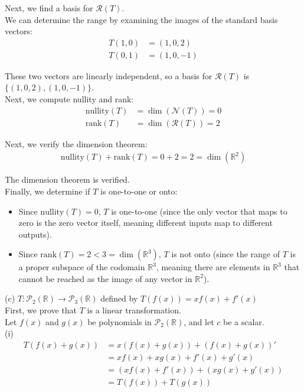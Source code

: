 \documentclass{article}
\begin{document}
Next, we find a basis for $\mathcal{R}(T)$. \\

We can determine the range by examining the images of the standard basis vectors:
\begin{align*}
T(1,0) &= (1,0,2)\\
T(0,1) &= (1,0,-1)
\end{align*}

These two vectors are linearly independent, so a basis for $\mathcal{R}(T)$ is $\{(1,0,2), (1,0,-1)\}$. \\

Next, we compute nullity and rank:
\begin{align*}
    \text{nullity}(T) &= \dim(\mathcal{N}(T)) = 0\\
    \text{rank}(T) &= \dim(\mathcal{R}(T)) = 2
\end{align*}

Next, we verify the dimension theorem:
\begin{align*}
    \text{nullity}(T) + \text{rank}(T) = 0 + 2 = 2 = \dim(\mathbb{R}^2)
\end{align*}

The dimension theorem is verified. \\

Finally, we determine if $T$ is one-to-one or onto:
\begin{itemize}
    \item Since $\text{nullity}(T) = 0$, $T$ is one-to-one (since the only vector that maps to zero is the zero vector itself, meaning different inputs map to different outputs).
    \item Since $\text{rank}(T) = 2 < 3 = \dim(\mathbb{R}^3)$, $T$ is not onto (since the range of $T$ is a proper subspace of the codomain $\mathbb{R}^3$, meaning there are elements in $\mathbb{R}^3$ that cannot be reached as the image of any vector in $\mathbb{R}^2$).
\end{itemize}

(c) $T : \mathcal{P}_2(\mathbb{R}) \to \mathcal{P}_3(\mathbb{R})$ defined by $T(f(x)) = xf(x) + f'(x)$ \\

First, we prove that $T$ is a linear transformation. \\

Let $f(x)$ and $g(x)$ be polynomials in $\mathcal{P}_2(\mathbb{R})$, and let $c$ be a scalar. \\

(i)
\begin{align*}
    T(f(x) + g(x)) &= x(f(x) + g(x)) + (f(x) + g(x))' \\
    &= xf(x) + xg(x) + f'(x) + g'(x) \\
    &= (xf(x) + f'(x)) + (xg(x) + g'(x)) \\
    &= T(f(x)) + T(g(x))
\end{align*}
\end{document}
